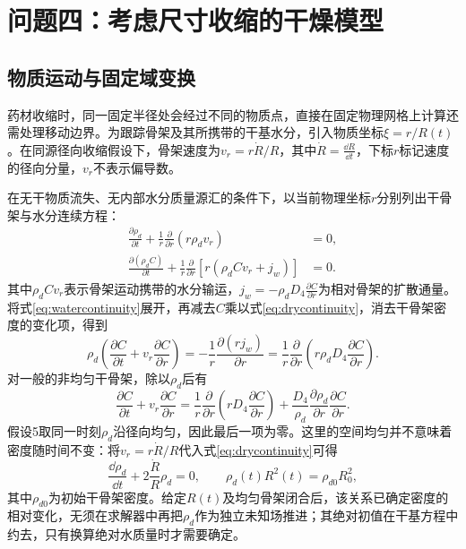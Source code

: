 \FloatBarrier

\section{问题四：考虑尺寸收缩的干燥模型}
\subsection{物质运动与固定域变换}
\label{sec:movingderivation}
药材收缩时，同一固定半径处会经过不同的物质点，直接在固定物理网格上计算还需处理移动边界。为跟踪骨架及其所携带的干基水分，引入物质坐标$\xi=r/R(t)$。在同源径向收缩假设下，骨架速度为$v_r=r\dot R/R$，其中$\dot R=\frac{\dd R}{\dd t}$，下标$r$标记速度的径向分量，$v_r$不表示偏导数。

在无干物质流失、无内部水分质量源汇的条件下，以当前物理坐标$r$分别列出干骨架与水分连续方程：
\begin{align}
\frac{\partial\rho_d}{\partial t}
+\frac1r\frac{\partial}{\partial r}(r\rho_dv_r)&=0,\label{eq:drycontinuity}\\
\frac{\partial(\rho_dC)}{\partial t}
+\frac1r\frac{\partial}{\partial r}\left[r(\rho_dCv_r+j_w)\right]&=0.\label{eq:watercontinuity}
\end{align}
其中$\rho_dCv_r$表示骨架运动携带的水分输运，$j_w=-\rho_dD_4\frac{\partial C}{\partial r}$为相对骨架的扩散通量。将式\eqref{eq:watercontinuity}展开，再减去$C$乘以式\eqref{eq:drycontinuity}，消去干骨架密度的变化项，得到
\begin{equation}
\rho_d\left(\frac{\partial C}{\partial t}+v_r\frac{\partial C}{\partial r}\right)
=-\frac1r\frac{\partial(rj_w)}{\partial r}
=\frac1r\frac{\partial}{\partial r}\left(r\rho_dD_4\frac{\partial C}{\partial r}\right).
\label{eq:drybasismaterial}
\end{equation}
对一般的非均匀干骨架，除以$\rho_d$后有
\begin{equation}
\frac{\partial C}{\partial t}+v_r\frac{\partial C}{\partial r}
=\frac1r\frac{\partial}{\partial r}\left(rD_4\frac{\partial C}{\partial r}\right)
+\frac{D_4}{\rho_d}\frac{\partial\rho_d}{\partial r}\frac{\partial C}{\partial r}.
\label{eq:drybasisgeneral}
\end{equation}
假设5取同一时刻$\rho_d$沿径向均匀，因此最后一项为零。这里的空间均匀并不意味着密度随时间不变：将$v_r=r\dot R/R$代入式\eqref{eq:drycontinuity}可得
\begin{equation}
\frac{\dd\rho_d}{\dd t}+2\frac{\dot R}{R}\rho_d=0,
\qquad \rho_d(t)R^2(t)=\rho_{d0}R_0^2,
\label{eq:drydensityshrink}
\end{equation}
其中$\rho_{d0}$为初始干骨架密度。给定$R(t)$及均匀骨架闭合后，该关系已确定密度的相对变化，无须在求解器中再把$\rho_d$作为独立未知场推进；其绝对初值在干基方程中约去，只有换算绝对水质量时才需要确定。

